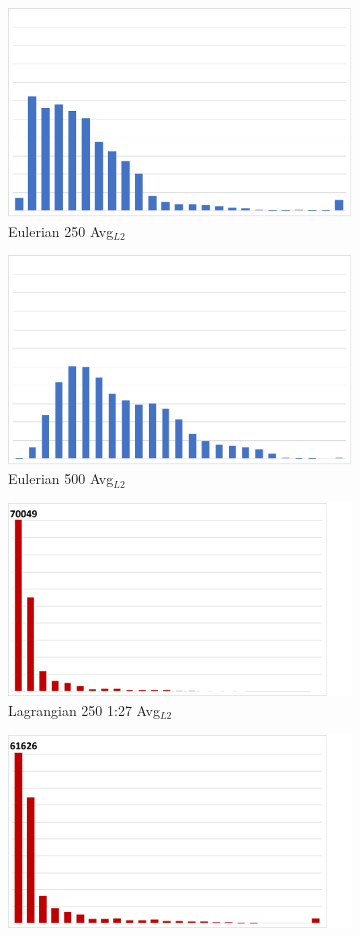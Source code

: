 \begin{figure}
\begin{subfigure}{0.24\textwidth}
\centering
\includegraphics[width=0.7\linewidth]{results/sw4/Eul1_AvgL2.pdf}
\caption{Eulerian 250 Avg$_{L2}$}
\end{subfigure}
\begin{subfigure}{0.24\textwidth}
\centering
\includegraphics[width=0.7\linewidth]{results/sw4/Eul2_AvgL2.pdf}
\caption{Eulerian 500 Avg$_{L2}$}
\end{subfigure}
\begin{subfigure}{0.24\textwidth}
\centering
\includegraphics[width=0.8\linewidth]{results/sw4/Lag3_AvgL2.pdf}
\caption{Lagrangian 250 1:27 Avg$_{L2}$}
\end{subfigure}
\begin{subfigure}{0.24\textwidth}
\centering
\includegraphics[width=0.8\linewidth]{results/sw4/Lag4_AvgL2.pdf}

\end{subfigure}
\end{figure}
